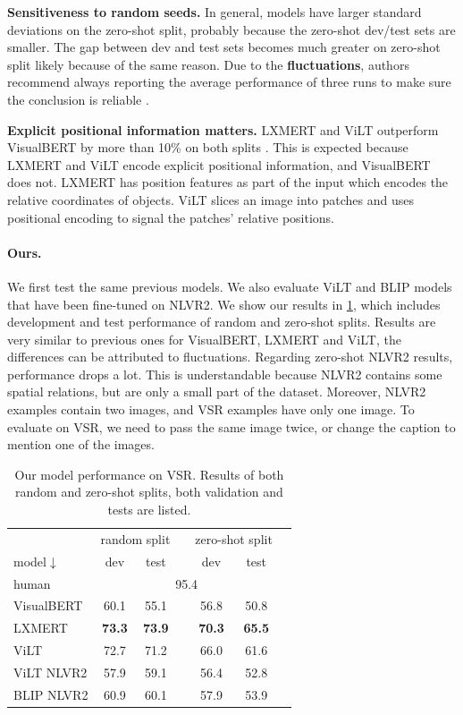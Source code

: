 \textbf{Sensitiveness to random seeds.} In general, models have larger standard deviations on the zero-shot split, probably because the zero-shot dev/test sets are smaller. The gap between dev and test sets becomes much greater on zero-shot split likely because of the same reason. Due to the \textbf{fluctuations}, authors recommend always reporting the average performance of three runs to make sure the conclusion is reliable \cite{liu2022visual}.

\textbf{Explicit positional information matters.} LXMERT and ViLT outperform VisualBERT by more than 10\% on both splits \cite{liu2022visual}. This is expected because LXMERT and ViLT encode explicit positional information, and VisualBERT does not. LXMERT has position features as part of the input which encodes the relative coordinates of objects. ViLT slices an image into patches and uses positional encoding to signal the patches' relative positions.

\paragraph{Ours.}

We first test the same previous models. We also evaluate ViLT \cite{kim2021vilt} and BLIP \cite{li2022blip} models that have been fine-tuned on NLVR2. We show our results in \cref{tab:vsr_results_ours}, which includes development and test performance of random and zero-shot splits. Results are very similar to previous ones for VisualBERT, LXMERT and ViLT, the differences can be attributed to fluctuations. Regarding zero-shot NLVR2 results, performance drops a lot. This is understandable because NLVR2 contains some spatial relations, but are only a small part of the dataset. Moreover, NLVR2 examples contain two images, and VSR examples have only one image. To evaluate on VSR, we need to pass the same image twice, or change the caption to mention one of the images.

\begin{table}[ht]
\centering
\small
\begin{tabular}{lcccccc}
\toprule
& \multicolumn{2}{c}{random split} &  & \multicolumn{2}{c}{zero-shot split} \\
\cmidrule(l){2-3} 	\cmidrule(l){4-6}
model$\downarrow$ & dev & test & & dev & test  \\
\midrule
human & \multicolumn{5}{c}{95.4}   \\
\midrule
VisualBERT & 60.1 & 55.1 & & 56.8 & 50.8  \\ 
LXMERT & \textbf{73.3} & \textbf{73.9} & & \textbf{70.3} & \textbf{65.5}   \\ 
ViLT & 72.7 & 71.2 & & 66.0 & 61.6  \\ 
ViLT NLVR2 & 57.9 & 59.1 & & 56.4 & 52.8  \\ 
BLIP NLVR2 & 60.9 & 60.1 & & 57.9 & 53.9  \\ 
\bottomrule
\end{tabular}
\caption{Our model performance on VSR. Results of both random and zero-shot splits, both validation and tests are listed.}
\label{tab:vsr_results_ours}
\end{table}

